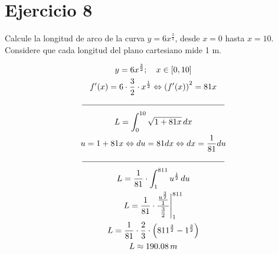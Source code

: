 \section*{Ejercicio 8}
\noindent Calcule la longitud de arco de la curva \(y = 6x^\frac{3}{2}\), desde \(x = 0\) hasta \(x = 10\). Considere que cada longitud
del plano cartesiano mide 1 m.

\begin{gather*}
  y = 6x^\frac{3}{2}; \quad x \in [0, 10] \\
  f'(x) = 6 \cdot \frac{3}{2} \cdot x^\frac{1}{2} \Leftrightarrow %
    \left( f'(x) \right)^2 = 81 x \\
  \rule{0.5\textwidth}{0.4pt} \\
  L = \int_{0}^{10} \sqrt{1 + 81 x} \, dx \\
  u = 1 + 81 x \Leftrightarrow %
    du = 81 dx \Leftrightarrow %
    dx = \frac{1}{81} du \\
  \rule{0.5\textwidth}{0.4pt} \\
  L = \frac{1}{81} \cdot \int_{1}^{811} u^\frac{1}{2} \, du \\
  L = \frac{1}{81} \cdot \frac{\frac{u^\frac{3}{2}}{1}}{\frac{3}{2}} \Bigg|_{1}^{811} \\
  L = \frac{1}{81} \cdot \frac{2}{3} \cdot \left( 811^\frac{3}{2} - 1^\frac{3}{2} \right) \\
  L \approx 190.08 \, m
\end{gather*}